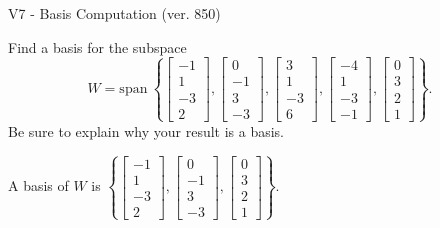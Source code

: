 \begin{exercise}
  \begin{exerciseTitle}V7 - Basis Computation (ver. 850)\end{exerciseTitle}
  \begin{exerciseStatement}
    Find a basis for the subspace 
\[W=\mathrm{span}\ \left\{\left[\begin{array}{r}
-1 \\
1 \\
-3 \\
2
\end{array}\right] , \left[\begin{array}{r}
0 \\
-1 \\
3 \\
-3
\end{array}\right] , \left[\begin{array}{r}
3 \\
1 \\
-3 \\
6
\end{array}\right] , \left[\begin{array}{r}
-4 \\
1 \\
-3 \\
-1
\end{array}\right] , \left[\begin{array}{r}
0 \\
3 \\
2 \\
1
\end{array}\right]\right\}.\]
 Be sure to explain why your result is a basis.


  \end{exerciseStatement}
  \begin{exerciseAnswer}
   A basis of \(W\) is  \(\left\{\left[\begin{array}{r}
-1 \\
1 \\
-3 \\
2
\end{array}\right] , \left[\begin{array}{r}
0 \\
-1 \\
3 \\
-3
\end{array}\right] , \left[\begin{array}{r}
0 \\
3 \\
2 \\
1
\end{array}\right]\right\}\).
  


  \end{exerciseAnswer}
\end{exercise}